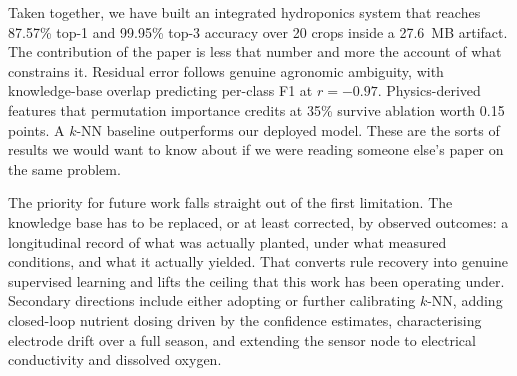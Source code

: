 \documentclass[conference]{IEEEtran}
\begin{document}
Taken together, we have built an integrated hydroponics system that reaches
87.57\% top-1 and 99.95\% top-3 accuracy over 20 crops inside a 27.6~MB
artifact. The contribution of the paper is less that number and more the
account of what constrains it. Residual error follows genuine agronomic
ambiguity, with knowledge-base overlap predicting per-class F1 at
$r = -0.97$. Physics-derived features that permutation importance credits at
35\% survive ablation worth 0.15 points. A $k$-NN baseline outperforms our
deployed model. These are the sorts of results we would want to know about
if we were reading someone else's paper on the same problem.

The priority for future work falls straight out of the first limitation.
The knowledge base has to be replaced, or at least corrected, by observed
outcomes: a longitudinal record of what was actually planted, under what
measured conditions, and what it actually yielded. That converts rule
recovery into genuine supervised learning and lifts the ceiling that this
work has been operating under. Secondary directions include either adopting
or further calibrating $k$-NN, adding closed-loop nutrient dosing driven by
the confidence estimates, characterising electrode drift over a full season,
and extending the sensor node to electrical conductivity and dissolved
oxygen.
\end{document}
